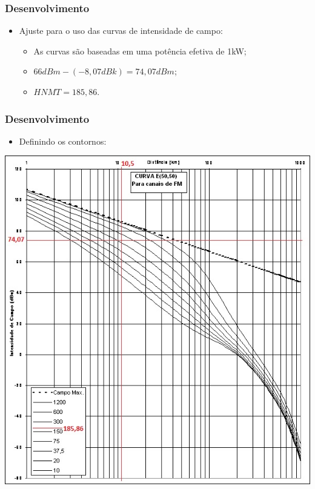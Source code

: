 \documentclass{beamer}
\begin{document}
  \begin{frame}
    
      \frametitle{Desenvolvimento}
      
       \begin{itemize}
      
      \item Ajuste para o uso das curvas de intensidade de campo: 
      
      
      
       \begin{itemize}
      
      \item As curvas são baseadas em uma potência efetiva de 1kW;
      \item $66dBm - (-8,07dBk) = 74,07dBm$;
      \item $HNMT = 185,86$.
   
       \end{itemize}
      
       \end{itemize}

       
	      
       
  \end{frame}
  
  
      \begin{frame}
    
      \frametitle{Desenvolvimento}
      
       \begin{itemize}
      
      \item Definindo os contornos: 
      
       \end{itemize}
      \begin{center}
      
           \includegraphics[width=.6\linewidth]{figs/e5050_calc.jpg}	
           
        \end{center}
      
  \end{frame}
  
\end{document}
